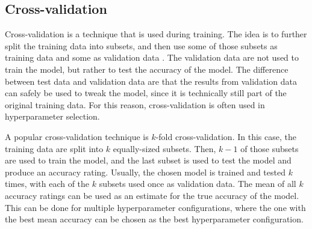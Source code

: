 \subsection{Cross-validation}
Cross-validation is a technique that is used during training.  The idea is to further split the training data into subsets, and then use some of those subsets as training data and some as validation data \cite{refaeilzadeh2009}.  The validation data are not used to train the model, but rather to test the accuracy of the model.  The difference between test data and validation data are that the results from validation data can safely be used to tweak the model, since it is technically still part of the original training data.  For this reason, cross-validation is often used in hyperparameter selection.

A popular cross-validation technique is $k$-fold cross-validation.  In this case, the training data are split into $k$ equally-sized subsets.  Then, $k-1$ of those subsets are used to train the model, and the last subset is used to test the model and produce an accuracy rating.  Usually, the chosen model is trained and tested $k$ times, with each of the $k$ subsets used once as validation data.  The mean of all $k$ accuracy ratings can be used as an estimate for the true accuracy of the model.  This can be done for multiple hyperparameter configurations, where the one with the best mean accuracy can be chosen as the best hyperparameter configuration.

